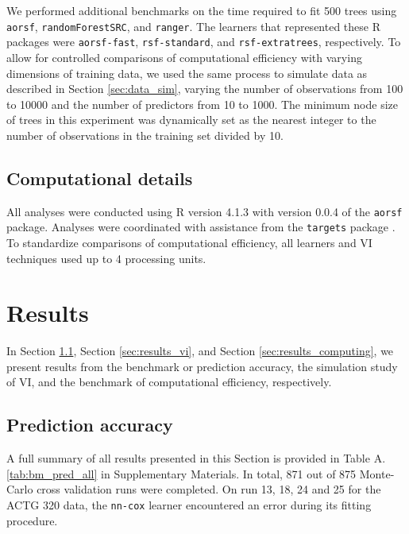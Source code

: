 \documentclass[12pt]{article}\usepackage[]{graphicx}\usepackage[]{xcolor}
\newcommand{\secref}[1]{Section \ref{#1}}
\newcommand{\tabrefAppendix}[1]{Table A.\ref{#1}}
\begin{document}
We performed additional benchmarks on the time required to fit 500 trees using \texttt{aorsf}, \texttt{randomForestSRC}, and \texttt{ranger}. The learners that represented these R packages were \texttt{aorsf-fast}, \texttt{rsf-standard}, and \texttt{rsf-extratrees}, respectively. To allow for controlled comparisons of computational efficiency with varying dimensions of training data, we used the same process to simulate data as described in \secref{sec:data_sim}, varying the number of observations from 100 to 10000 and the number of predictors from 10 to 1000. The minimum node size of trees in this experiment was dynamically set as the nearest integer to the number of observations in the training set divided by 10.

\subsection{Computational details} \label{sec:computing}

All analyses were conducted using R version 4.1.3 with version 0.0.4 of the \texttt{aorsf} \citep{jaeger2022aorsf} package. Analyses were coordinated with assistance from the \texttt{targets} package \citep{targets}. To standardize comparisons of computational efficiency, all learners and VI techniques used up to 4 processing units.


\section{Results} \label{sec:results}

In \secref{sec:results_pred}, \secref{sec:results_vi}, and \secref{sec:results_computing}, we present results from the benchmark or prediction accuracy, the simulation study of VI, and the benchmark of computational efficiency, respectively.

\subsection{Prediction accuracy} \label{sec:results_pred}

A full summary of all results presented in this Section is provided in \tabrefAppendix{tab:bm_pred_all} in Supplementary Materials. In total, 871 out of 875 Monte-Carlo cross validation runs were completed. On run 13, 18, 24 and 25 for the ACTG 320 data, the \texttt{nn-cox} learner encountered an error during its fitting procedure.
\end{document}
